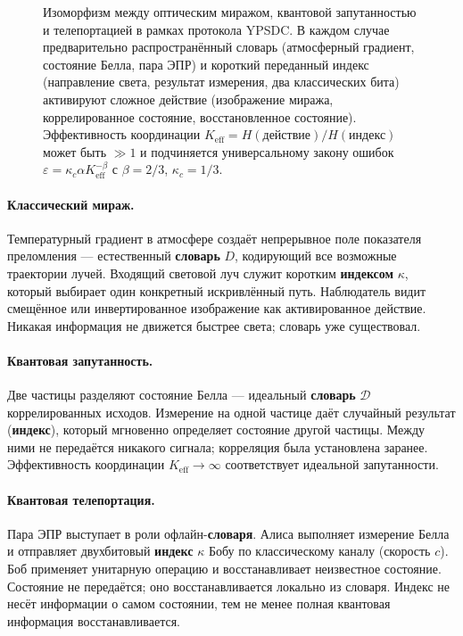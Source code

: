 \documentclass[12pt,a4paper]{article}
\theoremstyle{remark}
\begin{document}
\begin{figure}[htbp]
{%
		}
		\caption{Изоморфизм между оптическим миражом, квантовой запутанностью и телепортацией в рамках протокола YPSDC. В каждом случае предварительно распространённый словарь (атмосферный градиент, состояние Белла, пара ЭПР) и короткий переданный индекс (направление света, результат измерения, два классических бита) активируют сложное действие (изображение миража, коррелированное состояние, восстановленное состояние). Эффективность координации $K_{\mathrm{eff}} = H(\text{действие})/H(\text{индекс})$ может быть $\gg 1$ и подчиняется универсальному закону ошибок $\varepsilon = \kappa_c \alpha K_{\mathrm{eff}}^{-\beta}$ с $\beta=2/3$, $\kappa_c=1/3$.}
		\label{fig:mirage-ypsdc}
	\end{figure}
	
	\paragraph{Классический мираж.}
	Температурный градиент в атмосфере создаёт непрерывное поле показателя преломления — естественный \textbf{словарь} $D$, кодирующий все возможные траектории лучей. Входящий световой луч служит коротким \textbf{индексом} $\kappa$, который выбирает один конкретный искривлённый путь. Наблюдатель видит смещённое или инвертированное изображение как активированное действие. Никакая информация не движется быстрее света; словарь уже существовал.
	
	\paragraph{Квантовая запутанность.}
	Две частицы разделяют состояние Белла — идеальный \textbf{словарь} $\mathcal{D}$ коррелированных исходов. Измерение на одной частице даёт случайный результат (\textbf{индекс}), который мгновенно определяет состояние другой частицы. Между ними не передаётся никакого сигнала; корреляция была установлена заранее. Эффективность координации $K_{\mathrm{eff}} \to \infty$ соответствует идеальной запутанности.
	
	\paragraph{Квантовая телепортация.}
	Пара ЭПР выступает в роли офлайн-\textbf{словаря}. Алиса выполняет измерение Белла и отправляет двухбитовый \textbf{индекс} $\kappa$ Бобу по классическому каналу (скорость $c$). Боб применяет унитарную операцию и восстанавливает неизвестное состояние. Состояние не передаётся; оно восстанавливается локально из словаря. Индекс не несёт информации о самом состоянии, тем не менее полная квантовая информация восстанавливается.
	
\end{document}

